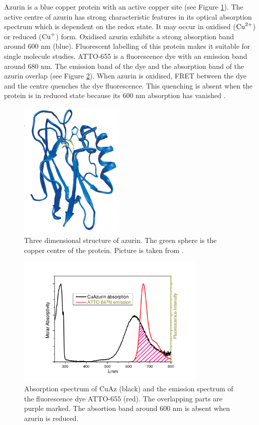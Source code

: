 \documentclass[twoside,single]{lion-msc}
\begin{document}
Azurin is a blue copper protein with an active copper site (see Figure \ref{azurin}). The active centre of azurin has strong characteristic features in its optical absorption spectrum which is dependent on the redox state. It may occur in oxidised ($\textup{Cu}^{2+}$) or reduced ($\textup{Cu}^{+}$) form. Oxidised azurin exhibits a strong absorption band around 600 nm (blue). Fluorescent labelling of this protein makes it suitable for single molecule studies. ATTO-655 is a fluorescence dye with an emission band around 680 nm. The emission band of the dye and the absorption band of the azurin overlap (see Figure \ref{absorption}). When azurin is oxidised, FRET between the dye and the centre quenches the dye fluorescence. This quenching is absent when the protein is in reduced state because its 600 nm absorption has vanished \cite{Tabares2014}.

\begin{figure}[ht!]
\centering
\includegraphics[width=50mm]{azurin1}
\caption{Three dimensional structure of azurin. The green sphere is the copper centre of the protein. Picture is taken from \cite{BORMAN2010}.} 
\label{azurin}
\end{figure}

\begin{figure}[ht!]
\centering
\includegraphics[width=90mm]{absorp.pdf}
\caption{Absorption spectrum of CuAz (black) and the emission spectrum of the fluorescence dye ATTO-655 (red). The overlapping parts are purple marked. The absortion band around 600 nm is absent when azurin is reduced.} 
\label{absorption}
\end{figure}
\end{document}
